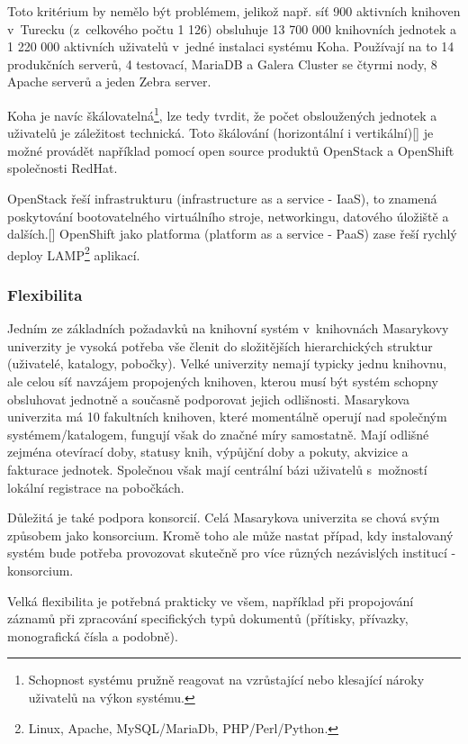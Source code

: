 \documentclass[
	11pt, oneside, printed, draft, 
	table,   %
	lof,     %
	lot     %
]{fithesis3}
\newcommand{\citepages}[2]{[\cite[#1]{#2}]}
\begin{document}
{Toto kritérium by nemělo být problémem, jelikož např. síť 900 aktivních knihoven v~Turecku (z~celkového počtu 1 126) obsluhuje 13 700 000 knihovních jednotek a 1 220 000 aktivních uživatelů v~jedné instalaci systému Koha.%
 Používají na to 14 produkčních serverů, 4 testovací, MariaDB a Galera Cluster se čtyrmi nody, 8 Apache serverů a jeden Zebra server. 

Koha je navíc škálovatelná\footnote{Schopnost systému pružně reagovat na vzrůstající nebo klesající nároky uživatelů na výkon systému.}, lze tedy tvrdit, že počet obsloužených jednotek a uživatelů je záležitost technická. Toto škálování (horizontální i vertikální)\citepages{1-4}{6847479} je možné provádět například pomocí open source produktů OpenStack a OpenShift společnosti RedHat. 

OpenStack řeší infrastrukturu (infrastructure as a service - IaaS), to znamená poskytování bootovatelného virtuálního stroje, networkingu, datového úložiště a dalších.\citepages{14-16}{breeding_2012} OpenShift jako platforma (platform as a service - PaaS) zase řeší rychlý deploy LAMP\footnote{Linux, Apache, MySQL/MariaDb, PHP/Perl/Python.} aplikací.

\subsubsection{Flexibilita}
Jedním ze základních požadavků na knihovní systém v~knihovnách Masarykovy univerzity je vysoká potřeba vše členit do složitějších hierarchických struktur (uživatelé, katalogy, pobočky). Velké univerzity nemají typicky jednu knihovnu, ale celou síť navzájem propojených knihoven, kterou musí být systém schopny obsluhovat jednotně a současně podporovat jejich odlišnosti. Masarykova univerzita má 10 fakultních knihoven, které momentálně operují nad společným systémem/katalogem, fungují však do značné míry samostatně. Mají odlišné zejména otevírací doby, statusy knih, výpůjční doby a pokuty, akvizice a fakturace jednotek. Společnou však mají centrální bázi uživatelů s~možností lokální registrace na pobočkách. 

Důležitá je také podpora konsorcií. Celá Masarykova univerzita se chová svým způsobem jako konsorcium. Kromě toho ale může nastat případ, kdy instalovaný systém bude potřeba provozovat skutečně pro více různých nezávislých institucí - konsorcium.

Velká flexibilita je potřebná prakticky ve všem, například při propojování záznamů při zpracování specifických typů dokumentů (přítisky, přívazky, monografická čísla a podobně).

}
\end{document}
